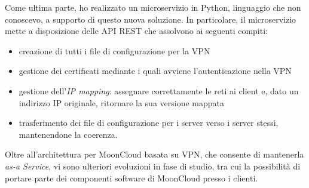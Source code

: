 \documentclass[10pt,a4paper]{article}
\begin{document}
        Come ultima parte, ho realizzato un microservizio in Python, linguaggio che non conoscevo,
        a supporto di questo nuova soluzione.
        In particolare, il microservizio mette a disposizione delle API REST che
        assolvono ai seguenti compiti:
        \begin{itemize}
            \item creazione di tutti i file di configurazione per la VPN
            \item gestione dei certificati mediante i quali avviene l'autenticazione
            nella VPN
            \item gestione dell'\textit{IP mapping}: assegnare correttamente le reti
            ai client e, dato un indirizzo IP originale, ritornare la sua versione mappata
            \item trasferimento dei file di configurazione per i server verso i server stessi,
            mantenendone la coerenza.
        \end{itemize}


        Oltre all'architettura per MoonCloud basata su VPN, che consente di mantenerla
        \textit{as-a Service}, vi sono ulteriori evoluzioni in fase di studio, tra cui
        la possibilità di portare parte dei componenti software di MoonCloud presso i clienti.

    
\end{document}
